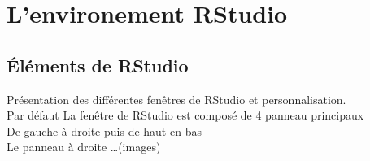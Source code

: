 \section{L'environement RStudio}
%

\subsection{Éléments de RStudio}
Présentation des différentes fenêtres de RStudio et personnalisation.\\
Par défaut La fenêtre de RStudio est composé de 4 panneau principaux\\
De gauche à droite puis de haut en bas\\

Le panneau à droite \dots (images)




